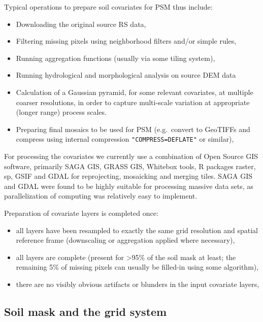 \documentclass[graybox,natbib,nospthms,UStrade]{svmono}
\begin{document}
Typical operations to prepare soil covariates for PSM thus include:

\begin{itemize}
\item
  Downloading the original source RS data,
\item
  Filtering missing pixels using neighborhood filters and/or simple
  rules,
\item
  Running aggregation functions (usually via some tiling system),
\item
  Running hydrological and morphological analysis on source DEM data
\item
  Calculation of a Gaussian pyramid, for some relevant covariates, at
  multiple coarser resolutions, in order to capture multi-scale
  variation at appropriate (longer range) process scales.
\item
  Preparing final mosaics to be used for PSM (e.g.~convert to GeoTIFFs
  and compress using internal compression \texttt{"COMPRESS=DEFLATE"} or
  similar),
\end{itemize}

For processing the covariates we currently use a combination of Open
Source GIS software, primarily SAGA GIS, GRASS GIS, Whitebox tools, R
packages raster, sp, GSIF and GDAL for reprojecting, mosaicking and
merging tiles. SAGA GIS and GDAL were found to be highly suitable for
processing massive data sets, as parallelization of computing was
relatively easy to implement.

Preparation of covariate layers is completed once:

\begin{itemize}
\item
  all layers have been resampled to exactly the same grid resolution
  and spatial reference frame (downscaling or aggregation applied
  where necessary),
\item
  all layers are complete (present for \textgreater{}95\% of the soil mask at
  least; the remaining 5\% of missing pixels can usually be filled-in
  using some algorithm),
\item
  there are no visibly obvious artifacts or blunders in the input
  covariate layers,
\end{itemize}

\hypertarget{soil-mask-and-the-grid-system}{%
\subsection{Soil mask and the grid system}\label{soil-mask-and-the-grid-system}}
\end{document}
